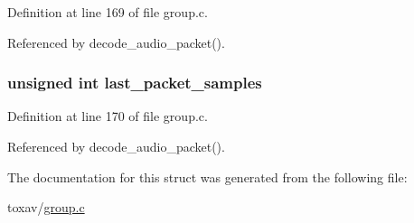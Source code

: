 Definition at line 169 of file group.\+c.



Referenced by decode\+\_\+audio\+\_\+packet().

\hypertarget{struct_group___peer___a_v_af679faefa170266e24bc2af9b5a0161e}{
\subsubsection[{last\+\_\+packet\+\_\+samples}]{\setlength{\rightskip}{0pt plus 5cm}unsigned int last\+\_\+packet\+\_\+samples}}\label{struct_group___peer___a_v_af679faefa170266e24bc2af9b5a0161e}


Definition at line 170 of file group.\+c.



Referenced by decode\+\_\+audio\+\_\+packet().



The documentation for this struct was generated from the following file\+:\begin{DoxyCompactItemize}
\item 
toxav/\hyperlink{toxav_2group_8c}{group.\+c}\end{DoxyCompactItemize}

